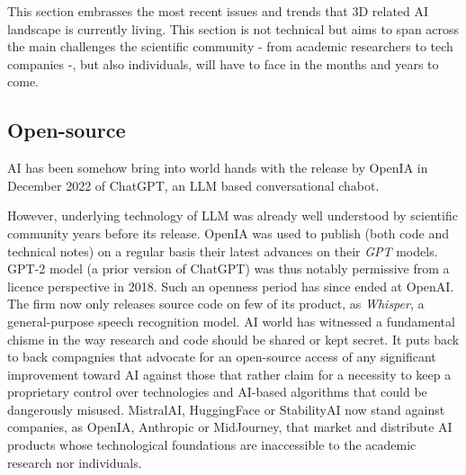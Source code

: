 This section embrasses the most recent issues and trends that 3D related \ac{AI} landscape is currently living. This section is not technical but aims to span across the main challenges the scientific community - from academic researchers to tech companies -, but also individuals, will have to face in the months and years to come. 

\subsection{Open-source}
\label{sec:conclusion-open}
\ac{AI} has been somehow bring into world hands with the release by OpenIA in December 2022 of ChatGPT, an \ac{LLM} based conversational chabot. 

However, underlying technology of \ac{LLM} was already well understood by scientific community years before its release. OpenIA was used to publish (both code and technical notes) on a regular basis their latest advances on their \textit{GPT} models. GPT-2 model (a prior version of ChatGPT) was thus notably permissive from a licence perspective in 2018. Such an openness period has since ended at OpenAI. The firm now only releases source code on few of its product, as \textit{Whisper}, a general-purpose speech recognition model. \ac{AI} world has witnessed a fundamental chisme in the way research and code should be shared or kept secret. It puts back to back compagnies that advocate for an open-source access of any significant improvement toward \ac{AI} against those that rather claim for a necessity to keep a proprietary control over technologies and \ac{AI}-based algorithms that could be dangerously misused. MistralAI, HuggingFace or StabilityAI now stand against companies, as OpenIA, Anthropic or MidJourney, that market and distribute \ac{AI} products whose technological foundations are inaccessible to the academic research nor individuals. 

